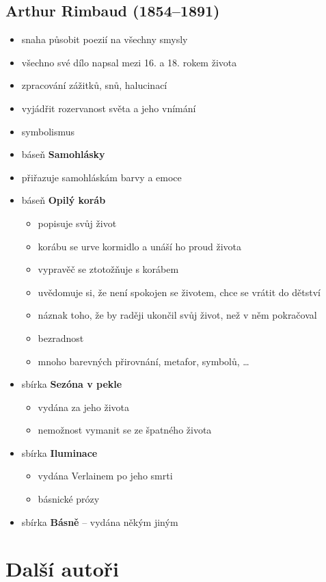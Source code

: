 \subsection{Arthur Rimbaud (1854--1891)}
\begin{itemize}
\item snaha působit poezií na všechny smysly
\item všechno své dílo napsal mezi 16. a 18. rokem života
\item zpracování zážitků, snů, halucinací
\item vyjádřit rozervanost světa a jeho vnímání
\item symbolismus
\item báseň \textbf{Samohlásky}
	\item přiřazuje samohláskám barvy a emoce
\item báseň \textbf{Opilý koráb}
	\begin{itemize}
	\item popisuje svůj život
	\item korábu se urve kormidlo a unáší ho proud života
	\item vypravěč se ztotožňuje s korábem
	\item uvědomuje si, že není spokojen se životem, chce se vrátit do dětství
	\item náznak toho, že by raději ukončil svůj život, než v něm pokračoval
	\item bezradnost
	\item mnoho barevných přirovnání, metafor, symbolů, \ldots
	\end{itemize}
\item sbírka \textbf{Sezóna v pekle} 
	\begin{itemize}
	\item vydána za jeho života
	\item nemožnost vymanit se ze špatného života
	\end{itemize}
\item sbírka \textbf{Iluminace}
	\begin{itemize}
	\item vydána Verlainem po jeho smrti
	\item básnické prózy
	\end{itemize}
\item sbírka \textbf{Básně} -- vydána někým jiným
\end{itemize}


\section{Další autoři}
